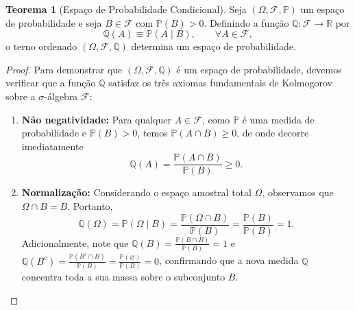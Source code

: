 \documentclass[12pt,portuguese]{article}
\let\ge\geqslant
\theoremstyle{definition}
\newtheorem{theorem}{Teorema}
\begin{document}
\begin{theorem}[Espaço de Probabilidade Condicional]\label{thm:cond-espaco-prob}
Seja \((\Omega, \mathcal{F}, \mathbb{P})\) um espaço de probabilidade e seja \(B \in \mathcal{F}\) com \(\mathbb{P}(B) > 0\). Definindo a função \(\mathbb{Q}: \mathcal{F} \to \mathbb{R}\) por
\begin{equation}\label{eq:medida-Q}
  \mathbb{Q}(A) \equiv \mathbb{P}(A \mid B), \qquad \forall A \in \mathcal{F},
\end{equation}
o terno ordenado \((\Omega, \mathcal{F}, \mathbb{Q})\) determina um espaço de probabilidade.
\end{theorem}

\begin{proof}
Para demonstrar que \((\Omega, \mathcal{F}, \mathbb{Q})\) é um espaço de probabilidade, devemos verificar que a função \(\mathbb{Q}\) satisfaz os três axiomas fundamentais de Kolmogorov sobre a \(\sigma\)-álgebra \(\mathcal{F}\):

\begin{enumerate}[label=\textbf{Axioma \arabic*:},leftmargin=*]
  \item \textbf{Não negatividade:} Para qualquer \(A \in \mathcal{F}\), como \(\mathbb{P}\) é uma medida de probabilidade e \(\mathbb{P}(B) > 0\), temos \(\mathbb{P}(A \cap B) \ge 0\), de onde decorre imediatamente
  \[
    \mathbb{Q}(A) = \frac{\mathbb{P}(A \cap B)}{\mathbb{P}(B)} \ge 0.
  \]

  \item \textbf{Normalização:} Considerando o espaço amostral total \(\Omega\), observamos que \(\Omega \cap B = B\). Portanto,
  \[
    \mathbb{Q}(\Omega) = \mathbb{P}(\Omega \mid B) = \frac{\mathbb{P}(\Omega \cap B)}{\mathbb{P}(B)} = \frac{\mathbb{P}(B)}{\mathbb{P}(B)} = 1.
  \]
  Adicionalmente, note que \(\mathbb{Q}(B) = \frac{\mathbb{P}(B \cap B)}{\mathbb{P}(B)} = 1\) e \(\mathbb{Q}(B^c) = \frac{\mathbb{P}(B^c \cap B)}{\mathbb{P}(B)} = \frac{\mathbb{P}(\varnothing)}{\mathbb{P}(B)} = 0\), confirmando que a nova medida \(\mathbb{Q}\) concentra toda a sua massa sobre o subconjunto \(B\).


\end{enumerate}
\end{proof}
\end{document}
